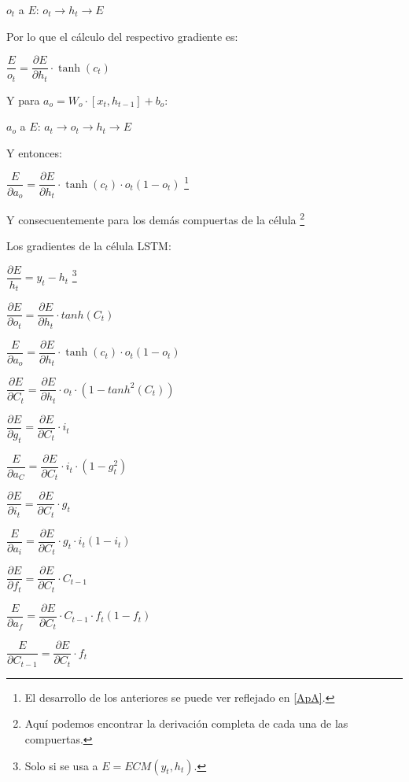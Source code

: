 \begin{center}
    $o_t$ a $E$: $o_t \longrightarrow h_t \longrightarrow E$
\end{center}
Por lo que el cálculo del respectivo gradiente es:

$\dfrac{E}{o_t} = \dfrac{\partial E}{\partial h_t} \cdot \tanh(c_t)$

Y para $a_o = W_{o} \cdot [x_t, h_{t-1}] + b_o$:

\begin{center}
    $a_o$ a $E$: $a_t \longrightarrow o_t \longrightarrow h_t \longrightarrow E$
\end{center}

Y entonces:

$\dfrac{E}{\partial a_o} = \dfrac{\partial E}{\partial h_t} \cdot \tanh(c_t) \cdot o_t(1-o_t)$ \footnote{El desarrollo de los anteriores se puede ver reflejado en \ref{ApA}.}

Y consecuentemente para los demás compuertas de la célula \cite{LSTM_gradients_Rahuljha} \footnote{Aquí podemos encontrar la derivación completa de cada una de las compuertas.} \cite{LSTM_fbp_calc_grad_Mallya}

Los gradientes de la célula LSTM:

\begin{center}
    $\dfrac{\partial E}{h_t} = y_t - h_t$ \footnote{Solo si se usa a $E = ECM(y_t,h_t)$.}
    
    $\dfrac{\partial E}{\partial o_t} = \dfrac{\partial E}{\partial h_t} \cdot tanh(C_t)$

    $\dfrac{E}{\partial a_o} = \dfrac{\partial E}{\partial h_t} \cdot \tanh(c_t) \cdot o_t(1-o_t)$ 

    $\dfrac{\partial E}{\partial C_t} = \dfrac{\partial E}{\partial h_t} \cdot o_t \cdot (1-tanh^2(C_t))$

    $\dfrac{\partial E}{\partial g_t} = \dfrac{\partial E}{\partial C_t} \cdot i_t$

    $\dfrac{E}{\partial a_C} = \dfrac{\partial E}{\partial C_t} \cdot i_t \cdot (1-g_t^2)$ 

    $\dfrac{\partial E}{\partial i_t} = \dfrac{\partial E}{\partial C_t} \cdot g_t$

    $\dfrac{E}{\partial a_i} = \dfrac{\partial E}{\partial C_t} \cdot g_t \cdot i_t(1-i_t)$ 

    $\dfrac{\partial E}{\partial f_t} = \dfrac{\partial E}{\partial C_t} \cdot C_{t-1}$

    $\dfrac{E}{\partial a_f} = \dfrac{\partial E}{\partial C_t} \cdot C_{t-1} \cdot f_t(1-f_t)$ 

    $\dfrac{E}{\partial C_{t-1}} = \dfrac{\partial E}{\partial C_t} \cdot f_t$ 
\end{center}

